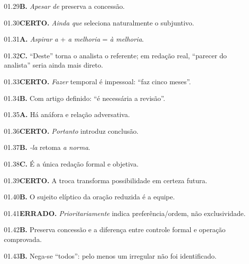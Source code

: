 \begin{solucao}{01.29}\textbf{B.} \emph{Apesar de} preserva a concessão.\end{solucao}
\begin{solucao}{01.30}\textbf{CERTO.} \emph{Ainda que} seleciona naturalmente o subjuntivo.\end{solucao}
\begin{solucao}{01.31}\textbf{A.} \emph{Aspirar a} + \emph{a melhoria} = \emph{à melhoria}.\end{solucao}
\begin{solucao}{01.32}\textbf{C.} ``Deste'' torna o analista o referente; em redação real, ``parecer do analista'' seria ainda mais direto.\end{solucao}
\begin{solucao}{01.33}\textbf{CERTO.} \emph{Fazer} temporal é impessoal: ``faz cinco meses''.\end{solucao}
\begin{solucao}{01.34}\textbf{B.} Com artigo definido: ``é necessária a revisão''.\end{solucao}
\begin{solucao}{01.35}\textbf{A.} Há anáfora e relação adversativa.\end{solucao}
\begin{solucao}{01.36}\textbf{CERTO.} \emph{Portanto} introduz conclusão.\end{solucao}
\begin{solucao}{01.37}\textbf{B.} \emph{-la} retoma \emph{a norma}.\end{solucao}
\begin{solucao}{01.38}\textbf{C.} É a única redação formal e objetiva.\end{solucao}
\begin{solucao}{01.39}\textbf{CERTO.} A troca transforma possibilidade em certeza futura.\end{solucao}
\begin{solucao}{01.40}\textbf{B.} O sujeito elíptico da oração reduzida é a equipe.\end{solucao}
\begin{solucao}{01.41}\textbf{ERRADO.} \emph{Prioritariamente} indica preferência/ordem, não exclusividade.\end{solucao}
\begin{solucao}{01.42}\textbf{B.} Preserva concessão e a diferença entre controle formal e operação comprovada.\end{solucao}
\begin{solucao}{01.43}\textbf{B.} Nega-se ``todos'': pelo menos um irregular não foi identificado.\end{solucao}
